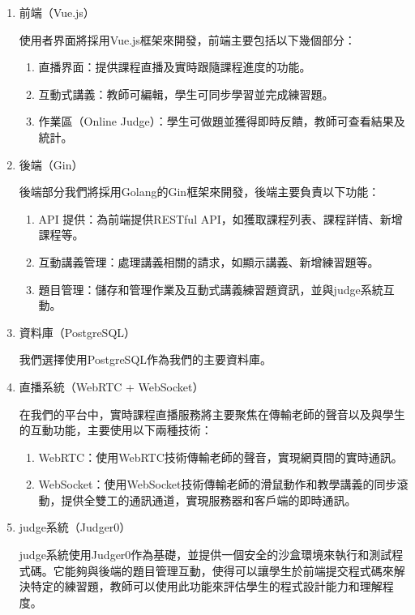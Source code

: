 \documentclass[12pt]{article}
\begin{document}
\begin{enumerate}[label=(\arabic*)]
  \setlength{\parindent}{2em}
  \item 前端（Vue.js）
  \par 使用者界面將採用Vue.js框架來開發，前端主要包括以下幾個部分：

  \begin{enumerate}[label=\textbullet, noitemsep]
    \item 直播界面：提供課程直播及實時跟隨課程進度的功能。
    \item 互動式講義：教師可編輯，學生可同步學習並完成練習題。
    \item 作業區（Online Judge）：學生可做題並獲得即時反饋，教師可查看結果及統計。
  \end{enumerate}

  \item 後端（Gin）
  \par 後端部分我們將採用Golang的Gin框架來開發，後端主要負責以下功能：

  \begin{enumerate}[label=\textbullet, noitemsep]
    \item API 提供：為前端提供RESTful API，如獲取課程列表、課程詳情、新增課程等。
    \item 互動講義管理：處理講義相關的請求，如顯示講義、新增練習題等。
    \item 題目管理：儲存和管理作業及互動式講義練習題資訊，並與judge系統互動。
  \end{enumerate}

  \item 資料庫（PostgreSQL）
  \par 我們選擇使用PostgreSQL作為我們的主要資料庫。

  \item 直播系統（WebRTC + WebSocket）
  \par 在我們的平台中，實時課程直播服務將主要聚焦在傳輸老師的聲音以及與學生的互動功能，主要使用以下兩種技術：

  \begin{enumerate}[label=\textbullet, noitemsep]
    \item WebRTC：使用WebRTC技術傳輸老師的聲音，實現網頁間的實時通訊。
    \item WebSocket：使用WebSocket技術傳輸老師的滑鼠動作和教學講義的同步滾動，提供全雙工的通訊通道，實現服務器和客戶端的即時通訊。
  \end{enumerate}

  \item judge系統（Judger0）
  \par judge系統使用Judger0作為基礎，並提供一個安全的沙盒環境來執行和測試程式碼。它能夠與後端的題目管理互動，使得可以讓學生於前端提交程式碼來解決特定的練習題，教師可以使用此功能來評估學生的程式設計能力和理解程度。\\


\end{enumerate}
\end{document}

